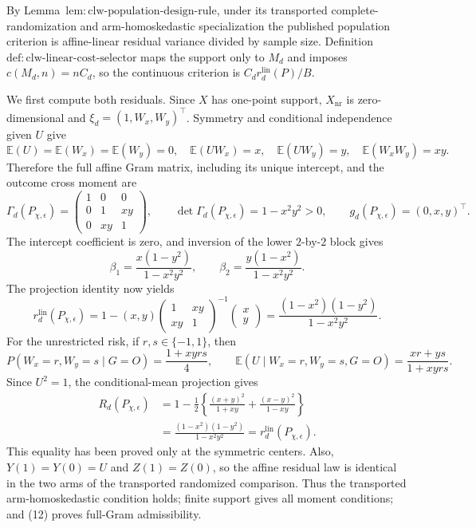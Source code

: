 By Lemma~\(\mathrm{lem{:}clw\text{-}population\text{-}design\text{-}rule}\), under its transported complete-randomization and arm-homoskedastic specialization the published population criterion is affine-linear residual variance divided by sample size. Definition~\(\mathrm{def{:}clw\text{-}linear\text{-}cost\text{-}selector}\) maps the support only to \(M_d\) and imposes \(c(M_d,n)=nC_d\), so the continuous criterion is \(C_dr_d^{\mathrm{lin}}(P)/B\).

We first compute both residuals. Since \(X\) has one-point support, \(X_{\mathrm{nr}}\) is zero-dimensional and \(\xi_d=(1,W_x,W_y)^\top\). Symmetry and conditional independence given \(U\) give
\[
 \mathbb E(U)=\mathbb E(W_x)=\mathbb E(W_y)=0,
 \quad \mathbb E(UW_x)=x,
 \quad \mathbb E(UW_y)=y,
 \quad \mathbb E(W_xW_y)=xy.                              \tag{11}
\]
Therefore the full affine Gram matrix, including its unique intercept, and the outcome cross moment are
\[
 \Gamma_d(P_{\chi,\epsilon})
 =\begin{pmatrix}1&0&0\\0&1&xy\\0&xy&1\end{pmatrix},
 \qquad \det\Gamma_d(P_{\chi,\epsilon})=1-x^2y^2>0,
 \qquad g_d(P_{\chi,\epsilon})=(0,x,y)^\top.              \tag{12}
\]
The intercept coefficient is zero, and inversion of the lower \(2\)-by-\(2\) block gives
\[
 \beta_1=\frac{x(1-y^2)}{1-x^2y^2},
 \qquad
 \beta_2=\frac{y(1-x^2)}{1-x^2y^2}.                       \tag{13}
\]
The projection identity now yields
\[
 r_d^{\mathrm{lin}}(P_{\chi,\epsilon})
 =1-(x,y)
 \begin{pmatrix}1&xy\\xy&1\end{pmatrix}^{-1}
 \begin{pmatrix}x\\y\end{pmatrix}
 =\frac{(1-x^2)(1-y^2)}{1-x^2y^2}.                        \tag{14}
\]
For the unrestricted risk, if \(r,s\in\{-1,1\}\), then
\[
 P(W_x=r,W_y=s\mid G=O)=\frac{1+xyrs}{4},
 \qquad
 \mathbb E(U\mid W_x=r,W_y=s,G=O)=\frac{xr+ys}{1+xyrs}.
\]
Since \(U^2=1\), the conditional-mean projection gives
\[
\begin{aligned}
 R_d(P_{\chi,\epsilon})
 &=1-\frac{1}{2}\left\{
 \frac{(x+y)^2}{1+xy}+\frac{(x-y)^2}{1-xy}\right\}\\
 &=\frac{(1-x^2)(1-y^2)}{1-x^2y^2}
 =r_d^{\mathrm{lin}}(P_{\chi,\epsilon}).                 \tag{15}
\end{aligned}
\]
This equality has been proved only at the symmetric centers. Also, \(Y(1)=Y(0)=U\) and \(Z(1)=Z(0)\), so the affine residual law is identical in the two arms of the transported randomized comparison. Thus the transported arm-homoskedastic condition holds; finite support gives all moment conditions; and (12) proves full-Gram admissibility.

